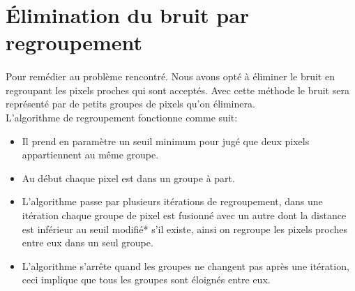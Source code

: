 \documentclass[12pt]{report}
\begin{document}
\section{Élimination du bruit par regroupement}
\paragraph{}Pour remédier au problème rencontré. Nous avons opté à éliminer le bruit en regroupant les pixels proches qui sont acceptés. Avec cette méthode le bruit sera représenté par de petits groupes de pixels qu'on éliminera.\\
L’algorithme de regroupement fonctionne comme suit:
\begin{itemize}
	\item Il prend en paramètre un seuil minimum pour jugé que deux pixels appartiennent au même groupe.
	
	\item Au début chaque pixel est dans un groupe à part.
	
	\item L’algorithme passe par plusieurs itérations de regroupement, dans une itération chaque groupe de pixel est fusionné avec un autre dont la distance est inférieur au seuil modifié* s'il existe, ainsi on regroupe les pixels proches entre eux dans un seul groupe.
	
	\item L’algorithme s’arrête quand les groupes ne changent pas après une itération, ceci implique que tous les groupes sont éloignés entre eux.
\end{itemize}
\end{document}
